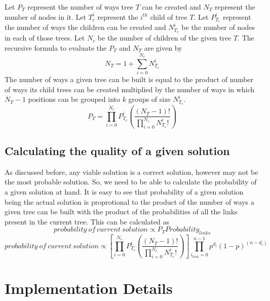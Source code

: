 \documentclass[12pt]{article}
\begin{document}
Let $P_T$ represent the number of ways tree $T$ can be created and $N_T$ represent the number of nodes in it. Let $T_c^i$ represent the $i^{th}$ child of tree $T$. Let $P_{T_c}^i$ represent the number of ways the children can be created and $N_{T_c}^i$ be the number of nodes in each of those trees. Let $N_c$ be the number of children of the given tree $T$. The recursive formula to evaluate the $P_T$ and $N_T$ are given by \\

\begin{equation}
  N_T = 1 + \sum_{i=0}^{N_c} N_{T_c}^i
\end{equation}
 The number of ways a given tree can be built is equal to the product of number of ways its child trees can be created multiplied by the number of ways in which $N_T-1$ positions can be grouped into $k$ groups of size $N_{T_c}^i$. 
\begin{equation}
  P_T = {\prod_{i=0}^{N_c} {P_{T_c}^i}} \left( \frac{(N_T - 1)!}{\prod_{i=0}^{N_c} {N_{T_c}^i}! } \right)
\end{equation}

\subsection{Calculating the quality of a given solution}
 As discussed before, any viable solution is a correct solution, however may not be the most probable solution. So, we need to be able to calculate the probability of a given solution at hand. It is easy to see that probability of a given solution being the actual solution is proprotional to the product of the number of ways a given tree can be built with the product of the probabilities of all the links present in the current tree. This can be calculated as 
\begin{equation}
 probability~of~current~solution  \propto  P_T Probability_{links}
\end{equation}
\begin{equation}                  
probability~of~current~solution \propto  \left[ \prod_{i=0}^{N_c} {P_{T_c}^i} \left( \frac{(N_T - 1)!}{\prod_{i=0}^{N_c} {N_{T_c}^i}! } \right) \right] \prod_{i_{link} = 0}^{n-1} p^{d_i}(1-p)^{(n-d_i)}
\end{equation}

\section{Implementation Details}
\end{document}
